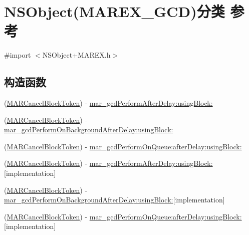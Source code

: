 \hypertarget{category_n_s_object_07_m_a_r_e_x___g_c_d_08}{}\section{N\+S\+Object(M\+A\+R\+E\+X\+\_\+\+G\+CD)分类 参考}
\label{category_n_s_object_07_m_a_r_e_x___g_c_d_08}


{\ttfamily \#import $<$N\+S\+Object+\+M\+A\+R\+E\+X.\+h$>$}

\subsection*{构造函数}
\begin{DoxyCompactItemize}
\item 
(\hyperlink{_n_s_object_09_m_a_r_e_x_8h_aefb8384298417c24573cc88fde04d1a7}{M\+A\+R\+Cancel\+Block\+Token}) -\/ \hyperlink{category_n_s_object_07_m_a_r_e_x___g_c_d_08_a19603069caf49cdf300e5972a6109699}{mar\+\_\+gcd\+Perform\+After\+Delay\+:using\+Block\+:}
\item 
(\hyperlink{_n_s_object_09_m_a_r_e_x_8h_aefb8384298417c24573cc88fde04d1a7}{M\+A\+R\+Cancel\+Block\+Token}) -\/ \hyperlink{category_n_s_object_07_m_a_r_e_x___g_c_d_08_a541826aa194d2a892c8406ec224b8769}{mar\+\_\+gcd\+Perform\+On\+Background\+After\+Delay\+:using\+Block\+:}
\item 
(\hyperlink{_n_s_object_09_m_a_r_e_x_8h_aefb8384298417c24573cc88fde04d1a7}{M\+A\+R\+Cancel\+Block\+Token}) -\/ \hyperlink{category_n_s_object_07_m_a_r_e_x___g_c_d_08_a4da3963ae7c8ca1a453ec86dc3a5b20e}{mar\+\_\+gcd\+Perform\+On\+Queue\+:after\+Delay\+:using\+Block\+:}
\item 
(\hyperlink{_n_s_object_09_m_a_r_e_x_8h_aefb8384298417c24573cc88fde04d1a7}{M\+A\+R\+Cancel\+Block\+Token}) -\/ \hyperlink{category_n_s_object_07_m_a_r_e_x___g_c_d_08_aac5c6267a5d77e4b23a63ccc219d427b}{mar\+\_\+gcd\+Perform\+After\+Delay\+:using\+Block\+:}{\ttfamily  \mbox{[}implementation\mbox{]}}
\item 
(\hyperlink{_n_s_object_09_m_a_r_e_x_8h_aefb8384298417c24573cc88fde04d1a7}{M\+A\+R\+Cancel\+Block\+Token}) -\/ \hyperlink{category_n_s_object_07_m_a_r_e_x___g_c_d_08_ae85cde8c1e3b578018aade73e0c3f85c}{mar\+\_\+gcd\+Perform\+On\+Background\+After\+Delay\+:using\+Block\+:}{\ttfamily  \mbox{[}implementation\mbox{]}}
\item 
(\hyperlink{_n_s_object_09_m_a_r_e_x_8h_aefb8384298417c24573cc88fde04d1a7}{M\+A\+R\+Cancel\+Block\+Token}) -\/ \hyperlink{category_n_s_object_07_m_a_r_e_x___g_c_d_08_afd4c4f0b95861795351e73ec53250811}{mar\+\_\+gcd\+Perform\+On\+Queue\+:after\+Delay\+:using\+Block\+:}{\ttfamily  \mbox{[}implementation\mbox{]}}
\end{DoxyCompactItemize}
